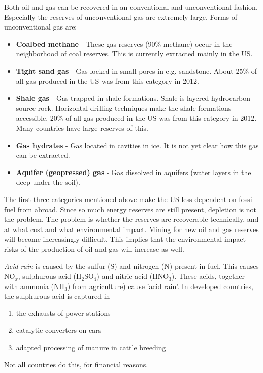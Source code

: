 \documentclass[a4paper,10pt]{article}
\begin{document}
Both oil and gas can be recovered in an conventional and unconventional fashion. Especially the reserves of unconventional gas are extremely large. Forms of unconventional gas are:
\begin{itemize}
 \item \textbf{Coalbed methane} - These gas reserves (90\% methane) occur in the neighborhood of coal reserves. This is currently extracted mainly in the US.
 \item \textbf{Tight sand gas} - Gas locked in small pores in e.g. sandstone. About 25\% of all gas produced in the US was from this category in 2012.
 \item \textbf{Shale gas} - Gas trapped in shale formations. Shale is layered hydrocarbon source rock. Horizontal drilling techniques make the shale formations accessible. 20\% of all gas produced in the US was from this category in 2012. Many countries have large reserves of this.
 \item \textbf{Gas hydrates} - Gas located in cavities in ice. It is not yet clear how this gas can be extracted.
 \item \textbf{Aquifer (geopressed) gas} - Gas dissolved in aquifers (water layers in the deep under the soil).
\end{itemize}

The first three categories mentioned above make the US less dependent on fossil fuel from abroad. Since so much energy reserves are still present, depletion is not the problem. The problem is whether the reserves are recoverable technically, and at what cost and what environmental impact. Mining for new oil and gas reserves will become increasingly difficult. This implies that the environmental impact risks of the production of oil and gas will increase as well. \bigskip

\emph{Acid rain} is caused by the sulfur (S) and nitrogen (N) present in fuel. This causes NO$_x$, sulphurous acid (H$_2$SO$_4$) and nitric acid (HNO$_3$). These acids, together with ammonia (NH$_3$) from agriculture) cause 'acid rain'. In developed countries, the sulphurous acid is captured in
\begin{enumerate}
 \item the exhausts of power stations
 \item catalytic converters on cars
 \item adapted processing of manure in cattle breeding
\end{enumerate}
Not all countries do this, for financial reasons. \bigskip
\end{document}
